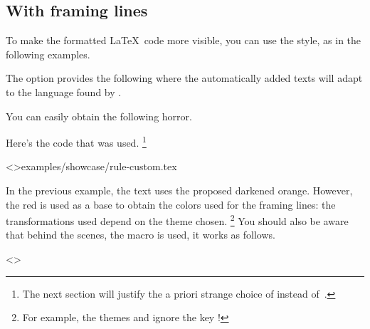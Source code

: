 \documentclass{tutodoc}
\begin{document}
\subsection{With framing lines}

To make the formatted \LaTeX\ code more visible, you can use the  style, as in the following examples.


\begin{tdocexa}
	The option  provides the following where the automatically added texts will adapt to the language found by \thisproj.

	
\end{tdocexa}


\begin{tdocexa}
	You can easily obtain the following horror.

	

	Here's the code that was used.%
	\footnote{
		The next section will justify the a priori strange choice of  instead of \,.
	}

	\tdoclatexinput<>{examples/showcase/rule-custom.tex}
\end{tdocexa}


\begin{tdocnote}
    In the previous example, the text uses the proposed darkened orange. However, the red is used as a base to obtain the colors used for the framing lines: the transformations used depend on the theme chosen.%
    \footnote{
        For example, the themes  and  ignore the key !
    }
    You should also be aware that behind the scenes, the macro  is used, it works as follows.

    \begin{tdoclatex}<>
    \end{tdoclatex}
\end{tdocnote}
\end{document}
